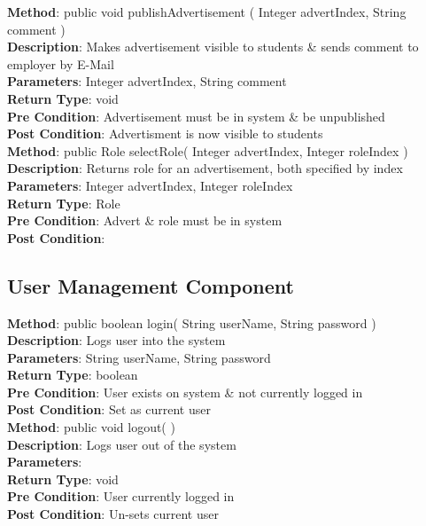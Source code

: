 \documentclass{l3deliverable}
\begin{document}
\textbf{Method}: public void publishAdvertisement ( Integer advertIndex, String comment )\\
\textbf{Description}: Makes advertisement visible to students \& sends comment to employer by E-Mail\\
\textbf{Parameters}: Integer advertIndex, String comment\\
\textbf{Return Type}: void\\
\textbf{Pre Condition}: Advertisement must be in system \& be unpublished\\
\textbf{Post Condition}: Advertisment is now visible to students\\

\textbf{Method}: public Role selectRole( Integer advertIndex, Integer roleIndex )\\
\textbf{Description}: Returns role for an advertisement, both specified by index\\
\textbf{Parameters}: Integer advertIndex, Integer roleIndex\\
\textbf{Return Type}: Role\\
\textbf{Pre Condition}: Advert \& role must be in system\\
\textbf{Post Condition}:\\


\subsection{User Management Component}

\textbf{Method}: public boolean login( String userName, String password )\\
\textbf{Description}: Logs user into the system\\
\textbf{Parameters}: String userName, String password\\
\textbf{Return Type}: boolean\\
\textbf{Pre Condition}: User exists on system \& not currently logged in\\
\textbf{Post Condition}: Set as current user\\

\textbf{Method}: public void logout( )\\
\textbf{Description}: Logs user out of the system\\
\textbf{Parameters}:\\
\textbf{Return Type}: void\\
\textbf{Pre Condition}: User currently logged in\\
\textbf{Post Condition}: Un-sets current user\\
\end{document}
